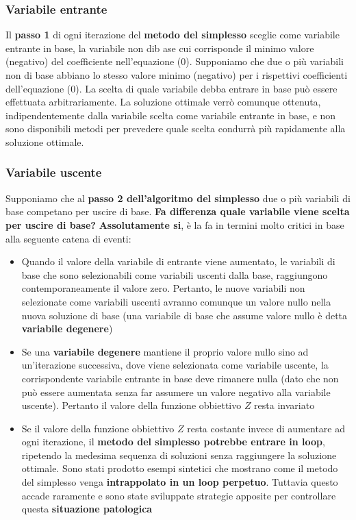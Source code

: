 \documentclass[12pt]{article}
\begin{document}
\subsubsection{Variabile entrante}
Il \textbf{passo 1} di ogni iterazione del \textbf{metodo del simplesso} sceglie come variabile entrante in base, la variabile non dib ase cui corrisponde il minimo valore (negativo) del coefficiente nell'equazione (0).
Supponiamo che due o più variabili non di base abbiano lo stesso valore minimo (negativo) per i rispettivi coefficienti dell'equazione (0). La scelta di quale variabile debba entrare in base può essere effettuata arbitrariamente.
La soluzione ottimale verrò comunque ottenuta, indipendentemente dalla variabile scelta come variabile entrante in base, e non sono disponibili metodi per prevedere quale scelta condurrà più rapidamente alla soluzione ottimale.
\subsubsection{Variabile uscente}
Supponiamo che al \textbf{passo 2 dell'algoritmo del simplesso} due o più variabili di base competano per uscire di base. \textbf{Fa differenza quale variabile viene scelta per uscire di base?}
\textbf{Assolutamente si}, è la fa in termini molto critici in base alla seguente catena di eventi:
\begin{itemize}
    \item Quando il valore della variabile di entrante viene aumentato, le variabili di base che sono selezionabili come variabili uscenti dalla base, raggiungono contemporaneamente il valore zero. Pertanto, le nuove variabili non selezionate come variabili uscenti avranno comunque
    un valore nullo nella nuova soluzione di base (una variabile di base che assume valore nullo è detta \textbf{variabile degenere})
    \item Se una \textbf{variabile degenere} mantiene il proprio valore nullo sino ad un'iterazione successiva, dove viene selezionata come variabile uscente, la corrispondente variabile entrante in base deve rimanere nulla (dato che non può essere aumentata senza far assumere un valore negativo alla variabile uscente).
    Pertanto il valore della funzione obbiettivo $Z$ resta invariato
    \item Se il valore della funzione obbiettivo $Z$ resta costante invece di aumentare ad ogni iterazione, il \textbf{metodo del simplesso potrebbe entrare in loop}, ripetendo la medesima sequenza di soluzioni senza raggiungere la soluzione ottimale. Sono stati prodotto esempi sintetici che mostrano come il metodo del simplesso venga
    \textbf{intrappolato in un loop perpetuo}. Tuttavia questo accade raramente e sono state sviluppate strategie apposite per controllare questa \textbf{situazione patologica}
\end{itemize}
\end{document}

